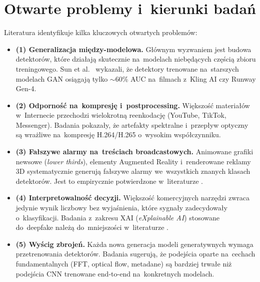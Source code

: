 \section{Otwarte problemy i~kierunki bada\'{n}}
\label{sec:otwarte_problemy}

Literatura identyfikuje kilka kluczowych otwartych problem\'{o}w:

\begin{itemize}
  \item \textbf{(1) Generalizacja mi\k{e}dzy-modelowa.}
    G\l{}\'{o}wnym wyzwaniem jest budowa detektor\'{o}w, kt\'{o}re dzia\l{}aj\k{a}
skutecznie na~modelach nieb\k{e}d\k{a}cych cz\k{e}\'{s}ci\k{a} zbioru treningowego.
    Sun et al.\ \cite{Sun2024GenVideo} wykazali, \.{z}e detektory
    trenowane na~starszych modelach GAN osi\k{a}gaj\k{a} tylko
    $\sim$60\% AUC na~filmach z~Kling AI czy Runway Gen-4.

  \item \textbf{(2) Odporno\'{s}\'{c} na~kompresj\k{e} i~postprocessing.}
Wi\k{e}kszo\'{s}\'{c} materia\l{}\'{o}w w~Internecie przechodzi wielokrotn\k{a}
reenkodacj\k{e} (YouTube, TikTok, Messenger). Badania
\cite{Caldelli2021OpticalFlowCNN, Nassif2022ImprovedOpticalFlow}
pokaza\l{}y, \.{z}e artefakty spektralne i~przep\l{}yw optyczny s\k{a}
wra\.{z}liwe na~kompresj\k{e} H.264/H.265 o~wysokim wsp\'{o}\l{}czynniku.

  \item \textbf{(3) Fa\l{}szywe alarmy na~tre\'{s}ciach broadcastowych.}
    Animowane grafiki newsowe (\textit{lower thirds}), elementy
    Augmented Reality i~renderowane reklamy 3D systematycznie generuj\k{a}
    fa\l{}szywe alarmy we~wszystkich znanych klasach detektor\'{o}w.
    Jest to empirycznie potwierdzone w~literaturze \cite{Wang2024ReliabilityPerspective}.

  \item \textbf{(4) Interpretowalno\'{s}\'{c} decyzji.}
Wi\k{e}kszo\'{s}\'{c} komercyjnych narz\k{e}dzi zwraca jedynie wynik liczbowy
bez wyja\'{s}nienia, kt\'{o}re sygna\l{}y zadecydowa\l{}y o~klasyfikacji.
Badania z~zakresu XAI (\textit{eXplainable AI}) stosowane do~deepfake
nale\.{z}\k{a} do~mniejszo\'{s}ci w~literaturze \cite{Khan2025ComprehensiveSurvey}.

  \item \textbf{(5) Wy\'{s}cig zbroje\'{n}.}
    Każda nowa generacja modeli generatywnych wymaga przetrenowania
    detektor\'{o}w. Badania \cite{Li2025AIGCSurvey} sugeruj\k{a},
    \.{z}e podej\'{s}cia oparte na~cechach fundamentalnych (FFT, optical flow,
    metadane) s\k{a} bardziej trwa\l{}e ni\.{z} podej\'{s}cia CNN trenowane
    end-to-end na~konkretnych modelach.
\end{itemize}

